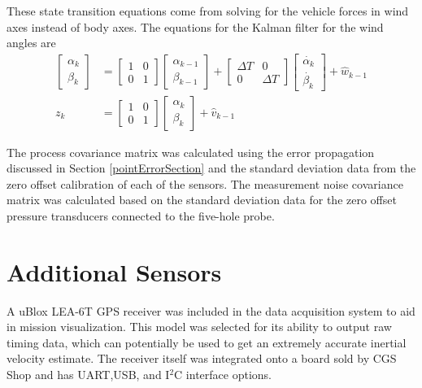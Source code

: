 These state transition equations come from solving for the vehicle forces in wind axes instead of body axes\cite{klein2006aircraft}. The equations for the Kalman filter for the wind angles are
\begin{align}
\begin{bmatrix}
\alpha_k\\\beta_k
\end{bmatrix} &= \begin{bmatrix}
1& 0\\0&1
\end{bmatrix}\begin{bmatrix}
\alpha_{k-1}\\\beta_{k-1}
\end{bmatrix}+\begin{bmatrix}
\Delta T& 0\\0&\Delta T
\end{bmatrix}\begin{bmatrix}
\dot{\alpha_{k}}\\\dot{\beta_{k}}
\end{bmatrix}+\hat{w}_{k-1}\\
z_k & = \begin{bmatrix}
1 & 0\\0&1
\end{bmatrix}\begin{bmatrix}
\alpha_{k}\\
\beta_{k}
\end{bmatrix}+\hat{v}_{k-1}
\end{align}

The process covariance matrix was calculated using the error propagation discussed in Section \ref{pointErrorSection} and the standard deviation data from the zero offset calibration of each of the sensors. The measurement noise covariance matrix was calculated based on the standard deviation data for the zero offset pressure transducers connected to the five-hole probe.


\section{Additional Sensors}
A uBlox LEA-6T GPS receiver was included in the data acquisition system to aid in mission visualization. This model was selected for its ability to output raw timing data, which can potentially be used to get an extremely accurate inertial velocity estimate\cite{ubloxDemo}. The receiver itself was integrated onto a board sold by CGS Shop and has UART,USB, and I$^2$C interface options. 

